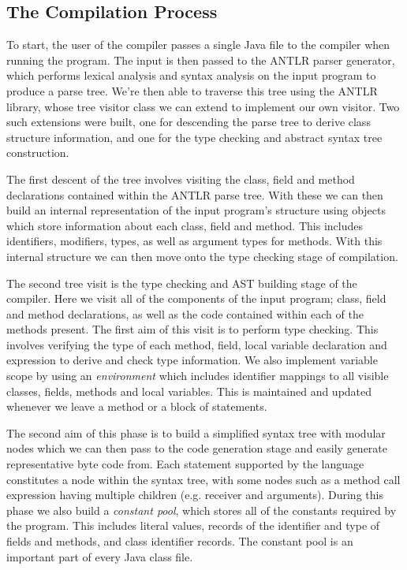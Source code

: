 \documentclass[a4paper, 11pt]{article}
\begin{document}
\subsection{The Compilation Process}
To start, the user of the compiler passes a single Java file to the compiler when running the program. The input is then passed to the ANTLR\cite{ANTLR} parser generator, which performs lexical analysis and syntax analysis on the input program to produce a parse tree. We're then able to traverse this tree using the ANTLR library, whose tree visitor class we can extend to implement our own visitor. Two such extensions were built, one for descending the parse tree to derive class structure information, and one for the type checking and abstract syntax tree construction.

The first descent of the tree involves visiting the class, field and method declarations contained within the ANTLR parse tree. With these we can then build an internal representation of the input program's structure using objects which store information about each class, field and method. This includes identifiers, modifiers, types, as well as argument types for methods. With this internal structure we can then move onto the type checking stage of compilation.

The second tree visit is the type checking and AST building stage of the compiler. Here we visit all of the components of the input program; class, field and method declarations, as well as the code contained within each of the methods present. The first aim of this visit is to perform type checking. This involves verifying the type of each method, field, local variable declaration and expression to derive and check type information. We also implement variable scope by using an \textit{environment} which includes identifier mappings to all visible classes, fields, methods and local variables. This is maintained and updated whenever we leave a method or a block of statements.

The second aim of this phase is to build a simplified syntax tree with modular nodes which we can then pass to the code generation stage and easily generate representative byte code from. Each statement supported by the language constitutes a node within the syntax tree, with some nodes such as a method call expression having multiple children (e.g. receiver and arguments). During this phase we also build a \textit{constant pool}, which stores all of the constants required by the program. This includes literal values, records of the identifier and type of fields and methods, and class identifier records. The constant pool is an important part of every Java class file.
\end{document}
